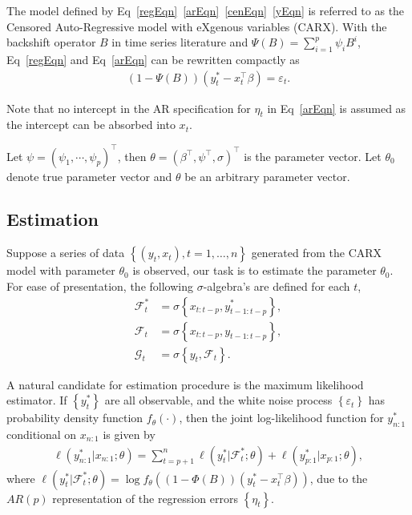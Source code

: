 \documentclass[a4paper,12pt]{article}
\def \trans{^\intercal}
\def \F {\mathcal{F}}
\def \G {\mathcal{G}}
\begin{document}
The model defined by Eq~\eqref{regEqn}~\eqref{arEqn}~\eqref{cenEqn}~\eqref{yEqn} is referred to as the Censored Auto-Regressive model with eXgenous variables (CARX).
With the backshift operator $B$ in time series literature and $\Psi(B) = \sum_{i=1}^p \psi_i B^i$, Eq~\eqref{regEqn} and Eq~\eqref{arEqn} can be rewritten compactly as
\begin{align}
(1-\Psi(B))(y_t^*-x_t\trans\beta) =  \varepsilon_t. \label{arEqn2}
\end{align}

Note that no intercept in the AR specification for $\eta_t$ in Eq~\eqref{arEqn} is assumed as the intercept can be absorbed into $x_t$.

Let $\psi = (\psi_1,\cdots,\psi_p)\trans$, then $\theta  = (\beta\trans,\psi\trans,\sigma)\trans$ is the parameter vector. Let $\theta_0$ denote true parameter vector and $\theta$ be an arbitrary parameter vector.

\subsection{Estimation}
Suppose a series of data $\left\{ (y_t,x_t),t=1,\dots,n \right\}$ generated from the CARX model with parameter $\theta_0$ is observed, our task is to estimate the parameter $\theta_0$.
For ease of presentation, the following $\sigma$-algebra's are defined for each $t$,
\begin{align*}
  \F^*_t&=\sigma\left\{ x_{t:t-p},y_{t-1:t-p}^* \right\},\\
  \F_t&=\sigma\left\{ x_{t:t-p},y_{t-1:t-p}\right\},\\
\G_t&=\sigma\left\{ y_t,\F_t \right\}.
\end{align*}

A natural candidate for estimation procedure is the maximum likelihood estimator. If $\left\{ y_t^* \right\}$ are all observable,
and the white noise process $\left\{ \varepsilon_t \right\}$ has probability density function $f_\theta(\cdot)$,
then the joint log-likelihood function for $ y_{n:1}^*$ conditional on $x_{n:1}$ is given by
\begin{align*}
  \ell(y_{n:1}^*|x_{n:1};\theta) =\sum_{t=p+1}^n \ell(y_t^*|\F^*_t;\theta) + \ell(y_{p:1}^*|x_{p:1};\theta),
\end{align*}
where $\ell(y_t^*|\F_t^*;\theta)=\log f_\theta( (1-\Phi(B))(y_t^*-x_t\trans\beta))$, due to the $AR(p)$ representation of the regression errors $\left\{ \eta_t \right\}$.
\end{document}
